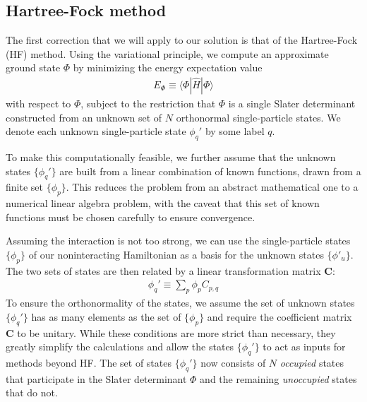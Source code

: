 \documentclass[amsmath, amssymb, aps, floatfix, nofootinbib, preprintnumbers,showpacs, superscriptaddress, twocolumn]{revtex4-1}
\begin{document}
\subsection{Hartree-Fock method}
\label{subsec:HartreeFockmethod}

The first correction that we will apply to our solution is that of the
Hartree-Fock (HF) method.  Using the variational principle, we compute an
approximate ground state $\Phi$ by minimizing the energy expectation value
\begin{align*}
  E_{\Phi} \equiv \langle \Phi | \hat H | \Phi \rangle
\end{align*}
with respect to $\Phi$, subject to the restriction that
$\Phi$ is a single Slater determinant constructed from an unknown
set of $N$ orthonormal single-particle states.  We denote each unknown
single-particle state $\phi_{q}'$ by some label $q$.

To make this computationally feasible, we further assume that the unknown
states $\{\phi_q'\}$ are built from a linear combination of known functions,
drawn from a finite set $\{\phi_p\}$.  This reduces the problem from an
abstract mathematical one to a numerical linear algebra problem, with the
caveat that this set of known functions must be chosen carefully to ensure
convergence.

Assuming the interaction is not too strong, we can use the single-particle
states $\{\phi_p\}$ of our noninteracting Hamiltonian as a basis for the
unknown states $\{\phi'_u\}$.  The two sets of states are then related by a
linear transformation matrix $\bm C$:
\begin{align*}
  \phi_q' \equiv \sum_p \phi_p C_{p, q}
\end{align*}
To ensure the orthonormality of the states, we assume the set of unknown states $\{\phi_q'\}$ has as many elements as the set of $\{\phi_p\}$ and require the coefficient matrix $\bm C$ to be unitary.  While these conditions are more strict than necessary, they greatly simplify the calculations and allow the states $\{\phi_q'\}$ to act as inputs for methods beyond HF.  The set of states $\{\phi_q'\}$ now consists of $N$ \textit{occupied} states that participate in the Slater determinant $\Phi$ and the remaining \textit{unoccupied} states that do not.
\end{document}
